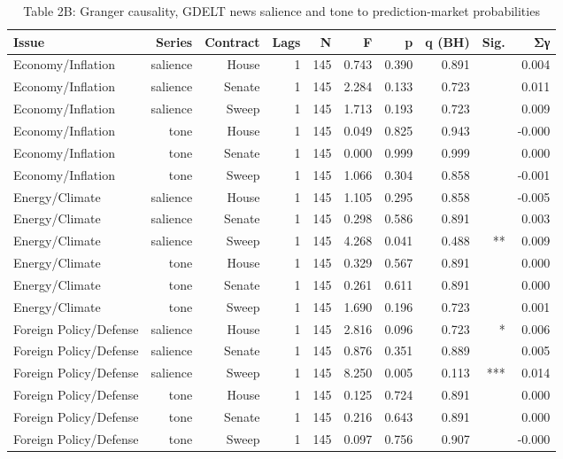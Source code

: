 \begin{table}[htbp]
\centering
\caption{Table 2B: Granger causality, GDELT news salience and tone to prediction-market probabilities}
\label{tab:table2b_news_salience}
\small
\begin{tabular}{lrrrrrrrrr}
\toprule
Issue & Series & Contract & Lags & N & F & p & q (BH) & Sig. & Σγ \\
\midrule
Economy/Inflation & salience & House & 1 & 145 & 0.743 & 0.390 & 0.891 &  & 0.004 \\
Economy/Inflation & salience & Senate & 1 & 145 & 2.284 & 0.133 & 0.723 &  & 0.011 \\
Economy/Inflation & salience & Sweep & 1 & 145 & 1.713 & 0.193 & 0.723 &  & 0.009 \\
Economy/Inflation & tone & House & 1 & 145 & 0.049 & 0.825 & 0.943 &  & -0.000 \\
Economy/Inflation & tone & Senate & 1 & 145 & 0.000 & 0.999 & 0.999 &  & 0.000 \\
Economy/Inflation & tone & Sweep & 1 & 145 & 1.066 & 0.304 & 0.858 &  & -0.001 \\
Energy/Climate & salience & House & 1 & 145 & 1.105 & 0.295 & 0.858 &  & -0.005 \\
Energy/Climate & salience & Senate & 1 & 145 & 0.298 & 0.586 & 0.891 &  & 0.003 \\
Energy/Climate & salience & Sweep & 1 & 145 & 4.268 & 0.041 & 0.488 & ** & 0.009 \\
Energy/Climate & tone & House & 1 & 145 & 0.329 & 0.567 & 0.891 &  & 0.000 \\
Energy/Climate & tone & Senate & 1 & 145 & 0.261 & 0.611 & 0.891 &  & 0.000 \\
Energy/Climate & tone & Sweep & 1 & 145 & 1.690 & 0.196 & 0.723 &  & 0.001 \\
Foreign Policy/Defense & salience & House & 1 & 145 & 2.816 & 0.096 & 0.723 & * & 0.006 \\
Foreign Policy/Defense & salience & Senate & 1 & 145 & 0.876 & 0.351 & 0.889 &  & 0.005 \\
Foreign Policy/Defense & salience & Sweep & 1 & 145 & 8.250 & 0.005 & 0.113 & *** & 0.014 \\
Foreign Policy/Defense & tone & House & 1 & 145 & 0.125 & 0.724 & 0.891 &  & 0.000 \\
Foreign Policy/Defense & tone & Senate & 1 & 145 & 0.216 & 0.643 & 0.891 &  & 0.000 \\
Foreign Policy/Defense & tone & Sweep & 1 & 145 & 0.097 & 0.756 & 0.907 &  & -0.000 \\

\end{tabular}
\end{table}
